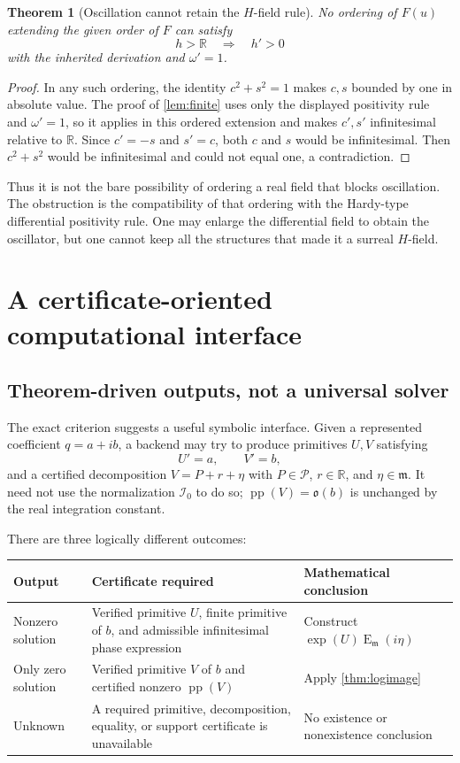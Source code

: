 \documentclass[11pt,letterpaper]{article}
\numberwithin{equation}{section}
\newtheorem{theorem}{Theorem}[section]
\theoremstyle{definition}
\theoremstyle{remark}
\newcommand{\R}{\mathbb R}
\newcommand{\mm}{\mathfrak m}
\newcommand{\PPi}{\mathcal P}
\newcommand{\pp}{\operatorname{pp}}
\newcommand{\Em}{\operatorname{E}_{\mm}}
\newcommand{\Izero}{\mathcal I_0}
\newcommand{\Obs}{\mathfrak o}
\begin{document}
\begin{theorem}[Oscillation cannot retain the $H$-field rule]\label{thm:orderobstruction}
No ordering of $F(u)$ extending the given order of $F$ can satisfy
\[
 h>\R\quad\Longrightarrow\quad h'>0
\]
with the inherited derivation and $\omega'=1$.
\end{theorem}
\begin{proof}
In any such ordering, the identity $c^2+s^2=1$ makes $c,s$ bounded by one in absolute value. The proof of \cref{lem:finite} uses only the displayed positivity rule and $\omega'=1$, so it applies in this ordered extension and makes $c',s'$ infinitesimal relative to $\R$. Since $c'=-s$ and $s'=c$, both $c$ and $s$ would be infinitesimal. Then $c^2+s^2$ would be infinitesimal and could not equal one, a contradiction.
\end{proof}

Thus it is not the bare possibility of ordering a real field that blocks oscillation. The obstruction is the compatibility of that ordering with the Hardy-type differential positivity rule. One may enlarge the differential field to obtain the oscillator, but one cannot keep all the structures that made it a surreal $H$-field.

\section{A certificate-oriented computational interface}\label{sec:computation}

\subsection{Theorem-driven outputs, not a universal solver}
The exact criterion suggests a useful symbolic interface. Given a represented coefficient $q=a+ib$, a backend may try to produce primitives $U,V$ satisfying
\[
 U'=a,\qquad V'=b,
\]
and a certified decomposition $V=P+r+\eta$ with $P\in\PPi$, $r\in\R$, and $\eta\in\mm$. It need not use the normalization $\Izero$ to do so; $\pp(V)=\Obs(b)$ is unchanged by the real integration constant.

There are three logically different outcomes:
\begin{center}\small
\begin{tabular}{L{0.22\textwidth}L{0.38\textwidth}L{0.30\textwidth}}
\toprule
Output & Certificate required & Mathematical conclusion\\
\midrule
Nonzero solution & Verified primitive $U$, finite primitive of $b$, and admissible infinitesimal phase expression & Construct $\exp(U)\Em(i\eta)$\\
Only zero solution & Verified primitive $V$ of $b$ and certified nonzero $\pp(V)$ & Apply \cref{thm:logimage}\\
Unknown & A required primitive, decomposition, equality, or support certificate is unavailable & No existence or nonexistence conclusion\\
\bottomrule
\end{tabular}
\end{center}
\end{document}
